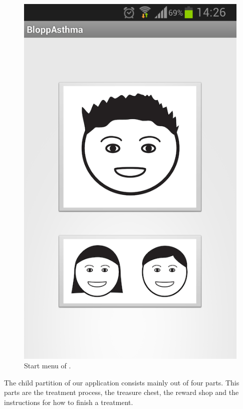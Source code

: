 \begin{figure}[H]
	\centering
	\includegraphics[width=0.25\paperwidth]{Pictures/app-screenshots/asthmapp-main-menu.png}
	\caption{Start menu of \app{}.}
	\label{fig:asthmapp-main-menu}
\end{figure}

The child partition of our application consists mainly out of four parts. This parts are the treatment process, the treasure chest, the reward shop and the instructions for how to finish a treatment.


